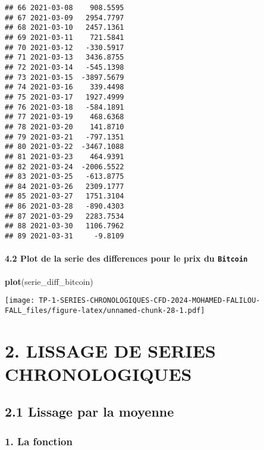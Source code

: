 \documentclass[
]{article}
\newenvironment{Shaded}{\begin{snugshade}}{\end{snugshade}}
\newcommand{\FunctionTok}[1]{\textcolor[rgb]{0.13,0.29,0.53}{\textbf{#1}}}
\newcommand{\NormalTok}[1]{#1}
\begin{document}
\begin{verbatim}
## 66 2021-03-08    908.5595
## 67 2021-03-09   2954.7797
## 68 2021-03-10   2457.1361
## 69 2021-03-11    721.5841
## 70 2021-03-12   -330.5917
## 71 2021-03-13   3436.8755
## 72 2021-03-14   -545.1398
## 73 2021-03-15  -3897.5679
## 74 2021-03-16    339.4498
## 75 2021-03-17   1927.4999
## 76 2021-03-18   -584.1891
## 77 2021-03-19    468.6368
## 78 2021-03-20    141.8710
## 79 2021-03-21   -797.1351
## 80 2021-03-22  -3467.1088
## 81 2021-03-23    464.9391
## 82 2021-03-24  -2006.5522
## 83 2021-03-25   -613.8775
## 84 2021-03-26   2309.1777
## 85 2021-03-27   1751.3104
## 86 2021-03-28   -890.4303
## 87 2021-03-29   2283.7534
## 88 2021-03-30   1106.7962
## 89 2021-03-31     -9.8109
\end{verbatim}

\paragraph{\texorpdfstring{4.2 Plot de la serie des differences pour le
prix du
\texttt{Bitcoin}}{4.2 Plot de la serie des differences pour le prix du Bitcoin}}\label{plot-de-la-serie-des-differences-pour-le-prix-du-bitcoin}

\begin{Shaded}
\begin{Highlighting}[]
\FunctionTok{plot}\NormalTok{(serie\_diff\_bitcoin)}
\end{Highlighting}
\end{Shaded}

\texttt{[image: TP-1-SERIES-CHRONOLOGIQUES-CFD-2024-MOHAMED-FALILOU-FALL\_files/figure-latex/unnamed-chunk-28-1.pdf]}

\section{2. LISSAGE DE SERIES
CHRONOLOGIQUES}\label{lissage-de-series-chronologiques}

\subsection{2.1 Lissage par la moyenne}\label{lissage-par-la-moyenne}

\subsubsection{1. La fonction}\label{la-fonction}
\end{document}
